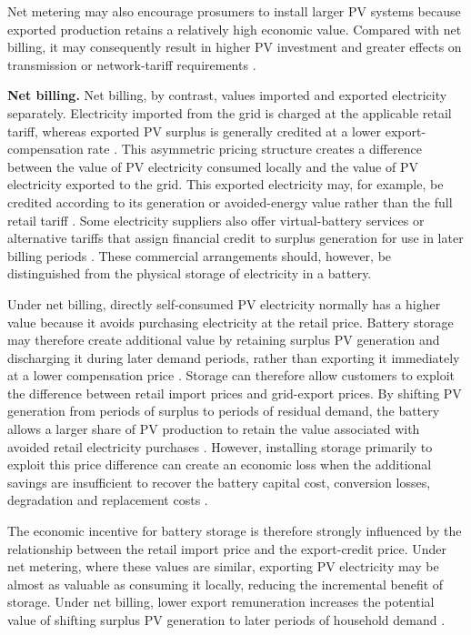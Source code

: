 Net metering may also encourage prosumers to install larger PV systems
because exported production retains a relatively high economic value.
Compared with net billing, it may consequently result in higher PV
investment and greater effects on transmission or network-tariff
requirements \cite{ch2ref058}.

\textbf{Net billing.} Net billing, by contrast, values imported and
exported electricity separately. Electricity imported from the grid is
charged at the applicable retail tariff, whereas exported PV surplus is
generally credited at a lower export-compensation rate
\cite{ch2ref056}. This asymmetric pricing structure creates a difference
between the value of PV electricity consumed locally and the value of PV
electricity exported to the grid. This exported electricity may, for example, be credited according to its
generation or avoided-energy value rather than the full retail tariff
\cite{ch2ref057}. Some electricity suppliers also offer virtual-battery
services or alternative tariffs that assign financial credit to surplus
generation for use in later billing periods \cite{ch2ref059}. These
commercial arrangements should, however, be distinguished from the
physical storage of electricity in a battery.

Under net billing, directly self-consumed PV electricity normally has a
higher value because it avoids purchasing electricity at the retail
price. Battery storage may therefore create additional value by
retaining surplus PV generation and discharging it during later demand
periods, rather than exporting it immediately at a lower compensation
price \cite{ch2ref056}. Storage can therefore allow customers to exploit the difference between
retail import prices and grid-export prices. By shifting PV generation
from periods of surplus to periods of residual demand, the battery
allows a larger share of PV production to retain the value associated
with avoided retail electricity purchases \cite{ch2ref056}. However,
installing storage primarily to exploit this price difference can create
an economic loss when the additional savings are insufficient to recover
the battery capital cost, conversion losses, degradation and replacement
costs \cite{ch2ref056}.

The economic incentive for battery storage is therefore strongly
influenced by the relationship between the retail import price and the
export-credit price. Under net metering, where these values are similar,
exporting PV electricity may be almost as valuable as consuming it
locally, reducing the incremental benefit of storage. Under net billing,
lower export remuneration increases the potential value of shifting
surplus PV generation to later periods of household demand
\cite{ch2ref053,ch2ref056}.

